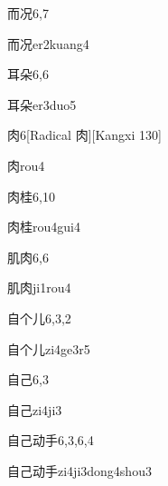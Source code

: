 \begin{entry}{而况}{6,7}
  \begin{phonetics}{而况}{er2kuang4}
  \end{phonetics}
\end{entry}

\begin{entry}{耳朵}{6,6}
  \begin{phonetics}{耳朵}{er3duo5}
  \end{phonetics}
\end{entry}

\begin{entry}{肉}{6}[Radical 肉][Kangxi 130]
  \begin{phonetics}{肉}{rou4}
  \end{phonetics}
\end{entry}

\begin{entry}{肉桂}{6,10}
  \begin{phonetics}{肉桂}{rou4gui4}
  \end{phonetics}
\end{entry}

\begin{entry}{肌肉}{6,6}
  \begin{phonetics}{肌肉}{ji1rou4}
  \end{phonetics}
\end{entry}

\begin{entry}{自个儿}{6,3,2}
  \begin{phonetics}{自个儿}{zi4ge3r5}
  \end{phonetics}
\end{entry}

\begin{entry}{自己}{6,3}
  \begin{phonetics}{自己}{zi4ji3}
  \end{phonetics}
\end{entry}

\begin{entry}{自己动手}{6,3,6,4}
  \begin{phonetics}{自己动手}{zi4ji3dong4shou3}
  \end{phonetics}
\end{entry}

